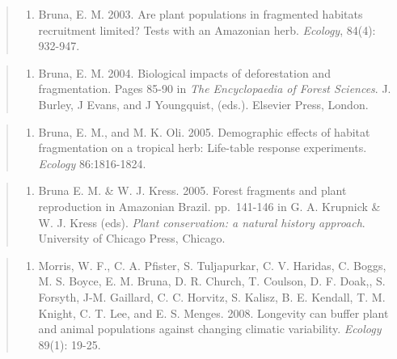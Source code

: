 \documentclass[
  12pt,
  man, donotrepeattitle,floatsintext]{apa6}
\providecommand{\tightlist}{%
  \setlength{\itemsep}{0pt}\setlength{\parskip}{0pt}}
\begin{document}
\begin{quote}
\begin{enumerate}
\def\labelenumi{\arabic{enumi}.}
\setcounter{enumi}{3}
\tightlist
\item
  Bruna, E. M. 2003. Are plant populations in fragmented habitats recruitment limited? Tests with an Amazonian herb. \emph{Ecology}, 84(4): 932-947.
\end{enumerate}
\end{quote}

\begin{quote}
\begin{enumerate}
\def\labelenumi{\arabic{enumi}.}
\setcounter{enumi}{4}
\tightlist
\item
  Bruna, E. M. 2004. Biological impacts of deforestation and fragmentation. Pages 85-90 in \emph{The Encyclopaedia of Forest Sciences}. J. Burley, J Evans, and J Youngquist, (eds.). Elsevier Press, London.
\end{enumerate}
\end{quote}

\begin{quote}
\begin{enumerate}
\def\labelenumi{\arabic{enumi}.}
\setcounter{enumi}{5}
\tightlist
\item
  Bruna, E. M., and M. K. Oli. 2005. Demographic effects of habitat fragmentation on a tropical herb: Life-table response experiments. \emph{Ecology} 86:1816-1824.
\end{enumerate}
\end{quote}

\begin{quote}
\begin{enumerate}
\def\labelenumi{\arabic{enumi}.}
\setcounter{enumi}{6}
\tightlist
\item
  Bruna E. M. \& W. J. Kress. 2005. Forest fragments and plant reproduction in Amazonian Brazil. pp.~141-146 in G. A. Krupnick \& W. J. Kress (eds). \emph{Plant conservation: a natural history approach}. University of Chicago Press, Chicago.
\end{enumerate}
\end{quote}

\begin{quote}
\begin{enumerate}
\def\labelenumi{\arabic{enumi}.}
\setcounter{enumi}{7}
\tightlist
\item
  Morris, W. F., C. A. Pfister, S. Tuljapurkar, C. V. Haridas, C. Boggs, M. S. Boyce, E. M. Bruna, D. R. Church, T. Coulson, D. F. Doak,, S. Forsyth, J-M. Gaillard, C. C. Horvitz, S. Kalisz, B. E. Kendall, T. M. Knight, C. T. Lee, and E. S. Menges. 2008. Longevity can buffer plant and animal populations against changing climatic variability. \emph{Ecology} 89(1): 19-25.
\end{enumerate}
\end{quote}
\end{document}
